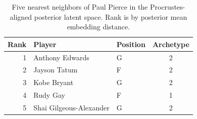 \begin{table}[htbp]
  \centering\small
  \begin{tabular}{rllc}
    \toprule
    Rank & Player & Position & Archetype \\
    \midrule
    1 & Anthony Edwards & G & 2 \\
    2 & Jayson Tatum & F & 2 \\
    3 & Kobe Bryant & G & 2 \\
    4 & Rudy Gay & F & 1 \\
    5 & Shai Gilgeous-Alexander & G & 2 \\
    \bottomrule
  \end{tabular}
  \caption{Five nearest neighbors of Paul Pierce in the Procrustes-aligned posterior latent space. Rank is by posterior mean embedding distance.}
  \label{tab:Paul_Pierce_neighbors}
\end{table}

